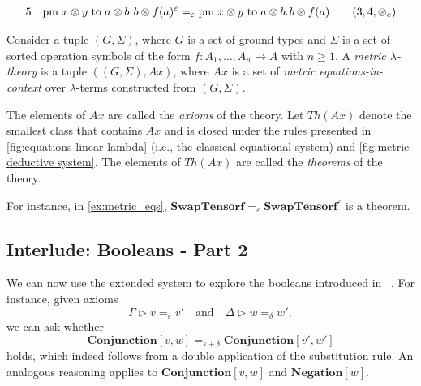 \begin{example}
\begin{equation*}
\begin{split}
  5\hspace{10 pt}& \text{pm} \hspace{3 pt} x \otimes y\hspace{3 pt} \text{to} \hspace{3 pt} a \otimes b. \hspace{1pt} b \otimes f(a)^{\varepsilon} =_{\varepsilon} \text{pm} \hspace{3 pt} x \otimes y\hspace{3 pt} \text{to} \hspace{3 pt} a \otimes b. \hspace{1pt} b \otimes f(a) & \hspace{10pt} \text{($3,4,\otimes_e$)}
  \end{split}
  \end{equation*}
\end{example}


\begin{definition} \label{def:metric_lambda_theory}
  Consider a tuple \( (G, \Sigma) \), where \( G \) is a set of ground types and \( \Sigma \) is a set of sorted operation symbols of the form \( f : A_1, \ldots, A_n \to A \) with \( n \geq 1 \). A \emph{metric $\lambda$-theory} is a tuple \( ((G, \Sigma), Ax) \), where \( Ax \) is a set of \emph{metric equations-in-context} over  $\lambda$-terms constructed from \( (G, \Sigma) \).
\end{definition}

The elements of \( Ax \) are called the \emph{axioms} of the theory. Let \( Th(Ax) \) denote the smallest class that contains \( Ax \) and is closed under the rules presented in \autoref{fig:equations-linear-lambda} (i.e., the classical equational system) and \autoref{fig:metric deductive system}. The elements of \( Th(Ax) \) are called the \emph{theorems} of the theory.

For instance, in \autoref{ex:metric_eqs}, $\textbf{SwapTensorf} =_{\varepsilon} \textbf{SwapTensorf}^\varepsilon$ is a theorem.




\subsection{Interlude: Booleans - Part 2}



We can now use the extended system to explore the booleans introduced in  . For instance, given axioms
$$ \Gamma \triangleright v =_{\varepsilon} v' \quad \text{and} \quad \Delta \triangleright w =_{\delta} w', $$
we can ask whether
$$ \textbf{Conjunction} [v, w] =_{\varepsilon + \delta}  \textbf{Conjunction} [v', w'] $$
holds, which indeed follows from a double application of the substitution rule. An analogous reasoning applies to $\textbf{Conjunction} [v, w]$ and $\textbf{Negation} [w]$.

